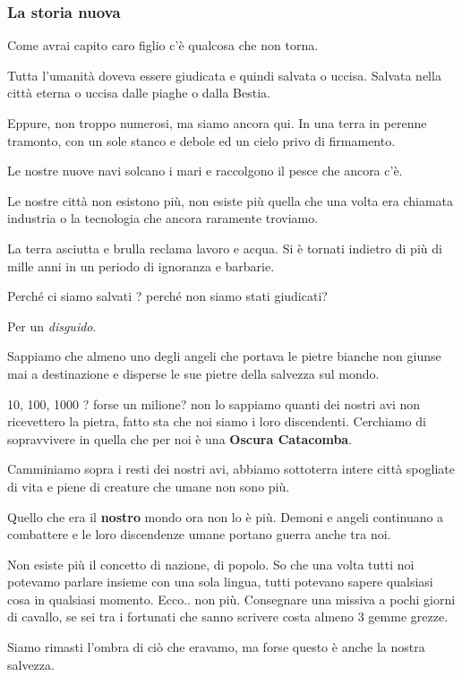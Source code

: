 \documentclass[12pt,a4paper,twoside,openany]{book}
\begin{document}
\subsubsection{La storia nuova}

Come avrai capito caro figlio c'è qualcosa che non torna.

Tutta l'umanità doveva essere giudicata e quindi salvata o uccisa. Salvata nella città eterna o uccisa dalle piaghe o dalla Bestia.

Eppure, non troppo numerosi, ma siamo ancora qui. In una terra in perenne tramonto, con un sole stanco e debole ed un cielo privo di firmamento.

Le nostre nuove navi solcano i mari e raccolgono il pesce che ancora c'è.

Le nostre città non esistono più, non esiste più quella che una volta era chiamata industria o la tecnologia che ancora raramente troviamo.

La terra asciutta e brulla reclama lavoro e acqua. Si è tornati indietro di più di mille anni in un periodo di ignoranza e barbarie.

Perché ci siamo salvati ? perché non siamo stati giudicati?

Per un \textit{disguido}. 

Sappiamo che almeno uno degli angeli che portava le pietre bianche non giunse mai a destinazione e disperse le sue pietre della salvezza sul mondo.

10, 100, 1000 ? forse un milione?  non lo sappiamo quanti  dei nostri avi non ricevettero la pietra, fatto sta che noi siamo i loro discendenti. Cerchiamo di sopravvivere in quella che per noi è una \textbf{Oscura Catacomba}.

Camminiamo sopra i resti dei nostri avi, abbiamo sottoterra intere città spogliate di vita e piene di creature che umane non sono più.

Quello che era il \textbf{nostro} mondo ora non lo è più. Demoni e angeli continuano a combattere e le loro discendenze umane portano guerra anche tra noi.

Non esiste più il concetto di nazione, di popolo. So che una volta tutti noi potevamo parlare insieme con una sola lingua, tutti potevano sapere qualsiasi cosa in qualsiasi momento.
Ecco.. non più. Consegnare una missiva a pochi giorni di cavallo, se sei tra i fortunati che sanno scrivere costa almeno 3 gemme grezze.

Siamo rimasti l'ombra di ciò che eravamo, ma forse questo è anche la nostra salvezza.
\end{document}
